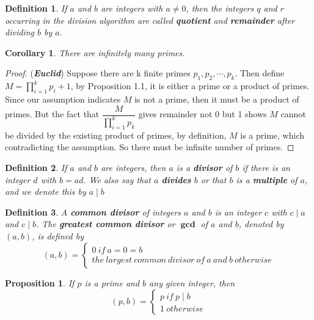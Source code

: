\documentclass{article}
\newtheorem*{definition}{Definition}
\newtheorem{proposition}[theorem]{Proposition}
\newtheorem{corollary}[theorem]{Corollary}
\begin{document}
    \begin{definition}
        If \(a\) and \(b\) are integers with \(a \neq 0\), then the integers \(q\) and 
        \(r\) occurring in the division algorithm are called \textbf{quotient} and 
        \textbf{remainder} after dividing \(b\) by \(a\).
    \end{definition}
    \begin{corollary}
        There are infinitely many primes.
    \end{corollary}
    \begin{proof}
        (\textbf{\textit{Euclid}})  Suppose there are k finite primes \(p_1, p_2, \cdots, p_k\).
        Then define \(M=\prod_{i=1}^k p_i + 1\), by Proposition 1.1, it is either a 
        prime or a product of primes. Since our assumption indicates \(M\) is not a 
        prime, then it must be a product of primes. But the fact that \(\dfrac{M}{\prod_{i=1}^k p_k}\) 
        gives remainder not 0 but 1 shows \(M\) cannot be divided by the existing 
        product of primes, by definition, \(M\) is a prime, which contradicting the 
        assumption. So there must be infinite number of primes.
    \end{proof}
    \begin{definition}
        If \(a\) and \(b\) are integers, then \(a\) is a \textbf{divisor} of \(b\) if 
        there is an integer \(d\) with \(b=ad\). We also say that \(a\) \textbf{divides} 
        \(b\) or that \(b\) is a \textbf{multiple} of \(a\), and we denote this by \(a \mid b\)
    \end{definition}
    \begin{definition}
        A \textbf{common divisor} of integers \(a\) and \(b\) is an integer \(c\) with 
        \(c \mid a\) and \(c \mid b\). The \textbf{greatest common divisor} or \(\bm{\gcd}\) 
        of \(a\) and \(b\), denoted by \((a, b)\), is defined by 
        \begin{equation*}
            (a, b) = \begin{cases}
                0 \ if \  a=0=b\\
                the\ largest\ common\ divisor\ of\ a\ and\ b\ otherwise
            \end{cases}
        \end{equation*}
    \end{definition}
    \begin{proposition}
        If \(p\) is a prime and \(b\) any given integer, then 
        \[
            (p, b)=\begin{cases}
                p\ if\ p \mid b\\
                1\ otherwise
            \end{cases}  
        \]
    \end{proposition}
\end{document}
